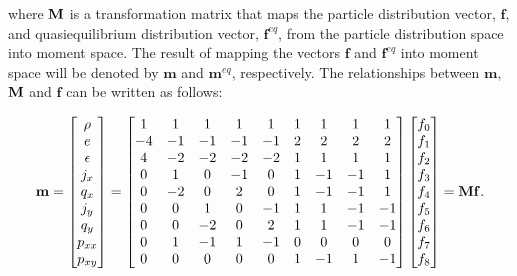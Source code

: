 \noindent where $\mathbf{M}$ is a transformation matrix that maps the particle distribution vector, $\mathbf{f}$, and quasiequilibrium distribution vector, $\mathbf{f}^{eq}$, from the particle distribution space into moment space.
The result of mapping the vectors $\mathbf{f}$ and $\mathbf{f}^{eq}$ into moment space will be denoted by $\mathbf{m}$ and $\mathbf{m}^{eq}$, respectively.
The relationships between $\mathbf{m}$, $\mathbf{M}$ and $\mathbf{f}$ can be written as follows:

\begin{equation} \label{eq:transformation-matrix}
\mathbf{m} = \begin{bmatrix}
\rho \\ e \\ \epsilon \\ j_x \\ q_x \\ j_y \\ q_y \\ p_{xx} \\ p_{xy}
\end{bmatrix} = \begin{bmatrix}
1 & 1 & 1 & 1 & 1 & 1 & 1 & 1 & 1 \\
-4 & -1 & -1 & -1 & -1 & 2 & 2 & 2 & 2 \\
4 & -2 & -2 & -2 & -2 & 1 & 1 & 1 & 1 \\
0 & 1 & 0 & -1 & 0 & 1 & -1 & -1 & 1 \\
0 & -2 & 0 & 2 & 0 & 1 & -1 & -1 & 1 \\
0 & 0 & 1 & 0 & -1 & 1 & 1 & -1 & -1 \\
0 & 0 & -2 & 0 & 2 & 1 & 1 & -1 & -1 \\
0 & 1 & -1 & 1 & -1 & 0 & 0 & 0 & 0 \\
0 & 0 & 0 & 0 & 0 & 1 & -1 & 1 & -1
\end{bmatrix} \begin{bmatrix}
f_0 \\
f_1 \\
f_2 \\
f_3 \\
f_4 \\
f_5 \\
f_6 \\
f_7 \\
f_8
\end{bmatrix} = \mathbf{M} \mathbf{f}.
\end{equation}

